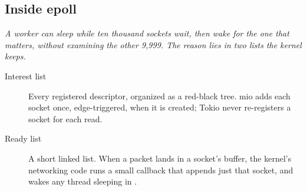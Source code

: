 
\subsection{Inside epoll}
\label{sec:wakers-ch14}

\textit{A worker can sleep while ten thousand sockets wait, then wake for the one that matters, without examining the other 9,999. The reason lies in two lists the kernel keeps.}

\begin{description}
    \item[Interest list] Every registered descriptor, organized as a red-black tree. mio adds each socket once, edge-triggered, when it is created; Tokio never re-registers a socket for each read.
    \item[Ready list] A short linked list. When a packet lands in a socket's buffer, the kernel's networking code runs a small callback that appends just that socket, and wakes any thread sleeping in .
\end{description}


